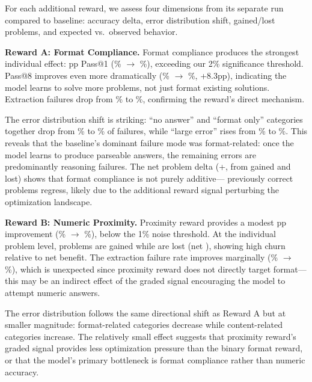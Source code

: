 For each additional reward, we assess four dimensions from its separate run compared to baseline: accuracy delta, error distribution shift, gained/lost problems, and expected vs.\ observed behavior.

\textbf{Reward A: Format Compliance.}
Format compliance produces the strongest individual effect: \pFourSeparateADeltaPassOne{}pp Pass@1 (\pFourBaselinePassOne\% $\to$ \pFourSeparateAPassOne\%), exceeding our 2\% significance threshold.
Pass@8 improves even more dramatically (\pFourBaselinePassEight\% $\to$ \pFourSeparateAPassEight\%, +8.3pp), indicating the model learns to solve more problems, not just format existing solutions.
Extraction failures drop from \pFourBaselineExtrFail\% to \pFourSeparateAExtrFail\%, confirming the reward's direct mechanism.

The error distribution shift is striking: ``no answer'' and ``format only'' categories together drop from \pFourBaselineFmtFailPct\% to \pFourSeparateAFmtFailPct\% of failures, while ``large error'' rises from \pFourBaselineLargeError\% to \pFourSeparateALargeError\%.
This reveals that the baseline's dominant failure mode was format-related: once the model learns to produce parseable answers, the remaining errors are predominantly reasoning failures.
The net problem delta (+\pFourSeparateANet, from \pFourSeparateAGained{} gained and \pFourSeparateALost{} lost) shows that format compliance is not purely additive---\pFourSeparateALost{} previously correct problems regress, likely due to the additional reward signal perturbing the optimization landscape.

\textbf{Reward B: Numeric Proximity.}
Proximity reward provides a modest \pFourSeparateBDeltaPassOne{}pp improvement (\pFourBaselinePassOne\% $\to$ \pFourSeparateBPassOne\%), below the 1\% noise threshold.
At the individual problem level, \pFourSeparateBGained{} problems are gained while \pFourSeparateBLost{} are lost (net \pFourSeparateBNet), showing high churn relative to net benefit.
The extraction failure rate improves marginally (\pFourBaselineExtrFail\% $\to$ \pFourSeparateBExtrFail\%), which is unexpected since proximity reward does not directly target format---this may be an indirect effect of the graded signal encouraging the model to attempt numeric answers.

The error distribution follows the same directional shift as Reward A but at smaller magnitude: format-related categories decrease while content-related categories increase.
The relatively small effect suggests that proximity reward's graded signal provides less optimization pressure than the binary format reward, or that the model's primary bottleneck is format compliance rather than numeric accuracy.
